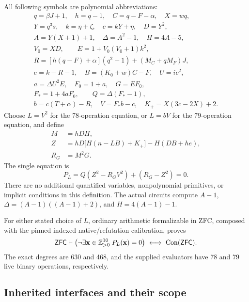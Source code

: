 All following symbols are polynomial abbreviations:
\begin{gather*}
 q=\beta J+1,\quad h=q-1,\quad C=q-F-\alpha,\quad X=wq,\\
 Y=q^3s,\quad k=\eta+\zeta,\quad c=kY+\eta,\quad D=Y^2,\\
 A=Y(X+1)+1,\quad \Delta=A^2-1,\quad H=4A-5,\\
 V_0=XD,\qquad E=1+V_0(V_0+1)k^2,\\
 R=[h(q-F)+\alpha](q^2-1)+(M_C+qM_F)J,\\
 e=k-R-1,\quad B=(K_0+w)C-F,\quad U=ic^2,\\
 a=\Delta U^2E,\quad F_0=1+a,\quad G=EF_0,\\
 F_*=1+4aF_0,\qquad Q=\Delta(F_*-1),\\
 b=c(T+\alpha)-R,\quad V=F_*b-c,\quad K_+=X(3c-2X)+2.
\end{gather*}
Choose $L=V^2$ for the 78-operation equation, or $L=bV$ for the
79-operation equation, and define
\begin{align*}
 M&=hDH,\\
 Z&=hD\bigl[H(n-LB)+K_+\bigr]-H(DB+he),\\
 R_G&=M^2G.
\end{align*}
The single equation is
\begin{equation}
 \boxed{\ P_L=Q(Z^2-R_GV^2)+(R_G-Z^2)=0.\ }
 \label{eq:compact-unscaled}
\end{equation}
There are no additional quantified variables, nonpolynomial primitives,
or implicit conditions in this definition. The actual circuits compute
$A-1$, $\Delta=(A-1)((A-1)+2)$, and $H=4(A-1)-1$.

\begin{theorem}
For either stated choice of $L$, ordinary arithmetic formalizable in ZFC,
composed with the pinned indexed native/refutation calibration, proves
\[
 \mathsf{ZFC}\vdash
 \bigl(\neg\exists\mathbf x\in\mathbb Z_{>0}^{10}\;
 P_L(\mathbf x)=0\bigr)\ \longleftrightarrow\ \operatorname{Con}(\mathsf{ZFC}).
\]
The exact degrees are 630 and 468, and the supplied evaluators have 78
and 79 live binary operations, respectively.
\end{theorem}

\subsection{Inherited interfaces and their scope}

